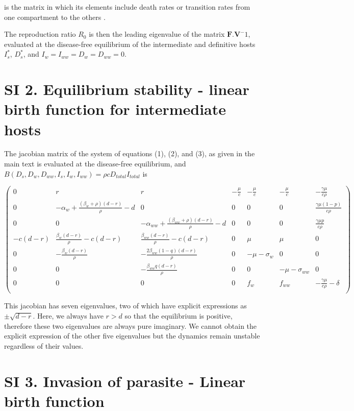\documentclass[11pt]{article}
\begin{document}
is the matrix in which its elements include death rates or transition rates from one compartment to the others \citep{Diekmann1990, Diekmann2009, hurford:JRSI:2010}. 

The reproduction ratio $R_0$ is then the leading eigenvalue of the matrix $\mathbf{F}.\mathbf{V}^-1$, evaluated at the disease-free equilibrium of the intermediate and definitive hosts $I_s^*$, $D_s^*$, and $I_w = I_{ww} = D_w = D_{ww} = 0$.

\section*{SI 2. Equilibrium stability - linear birth function for intermediate hosts}

The jacobian matrix of the system of equations (1), (2), and (3), as given in the main text  is evaluated at the disease-free equilibrium, and $B(D_s, D_w, D_{ww}, I_s, I_w, I_{ww}) = \rho c D_{total} I_{total}$ is

\[
\begin{pmatrix}
	0 & r & r & -\frac{\mu}{c} & -\frac{\mu }{c} & -\frac{\mu }{c} & -\frac{\gamma  \mu }{c \rho } \\
	0 & -\alpha_w + \frac{(\beta_w + \rho ) (d-r)}{\rho } - d & 0 & 0 & 0 & 0 & \frac{\gamma  \mu  (1-p)}{c \rho } \\
	0 & 0 & -\alpha_{ww} + \frac{(\beta_{ww} + \rho ) (d-r)}{\rho } - d & 0 & 0 & 0 & \frac{\gamma  \mu  p}{c \rho } \\
	-c (d-r) & \frac{\beta_w (d-r)}{\rho } - c (d-r) & \frac{\beta_{ww} (d-r)}{\rho }-c (d-r) & 0 & \mu  & \mu  & 0 \\
	0 & -\frac{\beta_w (d-r)}{\rho } & -\frac{2 \beta_{ww} (1-q) (d-r)}{\rho } & 0 & -\mu - \sigma_w & 0 & 0 \\
	0 & 0 & -\frac{\beta_{ww} q (d-r)}{\rho } & 0 & 0 & -\mu - \sigma_{ww} & 0 \\
	0 & 0 & 0 & 0 & f_w & f_{ww} & -\frac{\gamma  \mu }{c \rho } - \delta  \\
\end{pmatrix}
\]

This jacobian has seven eigenvalues, two of which have explicit expressions as $\pm \sqrt{d - r}$. Here, we always have $r > d$ so that the equilibrium is positive, therefore these two eigenvalues are always pure imaginary. We cannot obtain the explicit expression of the other five eigenvalues but the dynamics remain unstable regardless of their values.

\section*{SI 3. Invasion of parasite - Linear birth function }
\end{document}
